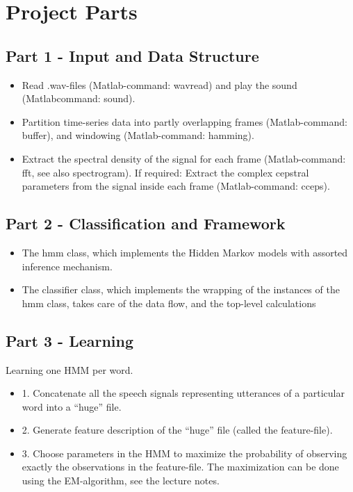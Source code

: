 \documentclass[titlepage]{article}
\begin{document}
\section{Project Parts}
	\subsection{Part 1 - Input and Data Structure}
\begin{itemize}
\item Read .wav-ﬁles (Matlab-command: wavread) and play the sound (Matlabcommand: sound).
\item Partition time-series data into partly overlapping frames (Matlab-command:
buffer), and windowing (Matlab-command: hamming).
\item Extract the spectral density of the signal for each frame (Matlab-command:
fft, see also spectrogram). If required: Extract the complex cepstral parameters from the signal inside each frame (Matlab-command: cceps).
\end{itemize}

	\subsection{Part 2 - Classification and Framework}
\begin{itemize}
\item The hmm class, which implements the Hidden Markov models with assorted inference mechanism.
\item The classifier class, which implements the wrapping of the instances of the hmm class, takes care of the data ﬂow, and the top-level calculations
\end{itemize}	

    \subsection{Part 3 - Learning}
Learning one HMM per word. 
\begin{itemize}
\item 1. Concatenate all the speech signals representing utterances of a particular word into a “huge” ﬁle.
\item 2. Generate feature description of the “huge” ﬁle (called the feature-ﬁle).
\item 3. Choose parameters in the HMM to maximize the probability of observing exactly the observations in the feature-ﬁle. The maximization can be done using the EM-algorithm, see the lecture notes.
\end{itemize}
\end{document}
